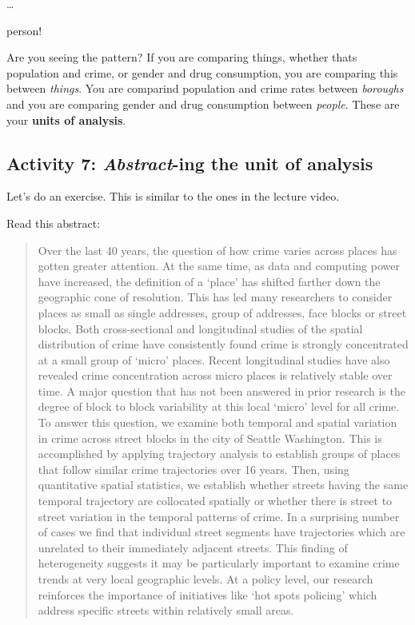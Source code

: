 \documentclass[
]{book}
\begin{document}
\ldots{}

person!

Are you seeing the pattern? If you are comparing things, whether thats population and crime, or gender and drug consumption, you are comparing this between \emph{things}. You are comparind population and crime rates between \emph{boroughs} and you are comparing gender and drug consumption between \emph{people}. These are your \textbf{units of analysis}.

\hypertarget{activity-7-abstract-ing-the-unit-of-analysis}{%
\subsection{\texorpdfstring{Activity 7: \emph{Abstract}-ing the unit of analysis}{Activity 7: Abstract-ing the unit of analysis}}\label{activity-7-abstract-ing-the-unit-of-analysis}}

Let's do an exercise. This is similar to the ones in the lecture video.

Read this abstract:

\begin{quote}
Over the last 40 years, the question of how crime varies across places has gotten greater attention. At the same time, as data and computing power have increased, the definition of a `place' has shifted farther down the geographic cone of resolution. This has led many researchers to consider places as small as single addresses, group of addresses, face blocks or street blocks. Both cross-sectional and longitudinal studies of the spatial distribution of crime have consistently found crime is strongly concentrated at a small group of `micro' places. Recent longitudinal studies have also revealed crime concentration across micro places is relatively stable over time. A major question that has not been answered in prior research is the degree of block to block variability at this local `micro' level for all crime. To answer this question, we examine both temporal and spatial variation in crime across street blocks in the city of Seattle Washington. This is accomplished by applying trajectory analysis to establish groups of places that follow similar crime trajectories over 16 years. Then, using quantitative spatial statistics, we establish whether streets having the same temporal trajectory are collocated spatially or whether there is street to street variation in the temporal patterns of crime. In a surprising number of cases we find that individual street segments have trajectories which are unrelated to their immediately adjacent streets. This finding of heterogeneity suggests it may be particularly important to examine crime trends at very local geographic levels. At a policy level, our research reinforces the importance of initiatives like `hot spots policing' which address specific streets within relatively small areas.
\end{quote}
\end{document}
